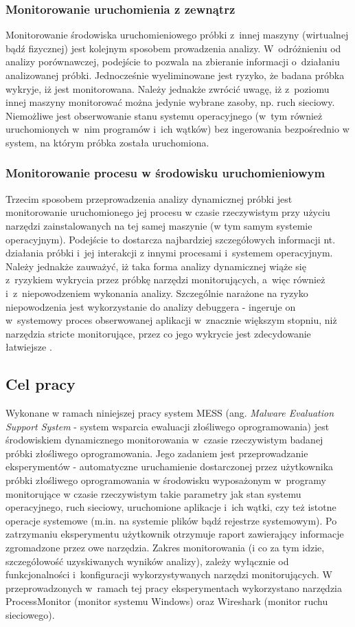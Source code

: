 \documentclass[a4paper,12pt,oneside]{article}
\begin{document}
	\subsubsection{Monitorowanie uruchomienia z zewnątrz}	
	Monitorowanie środowiska uruchomieniowego próbki z~innej maszyny (wirtualnej bądź fizycznej) jest kolejnym sposobem prowadzenia analizy. W~odróżnieniu od analizy porównawczej, podejście to pozwala na zbieranie informacji o~działaniu analizowanej próbki. Jednocześnie wyeliminowane jest ryzyko, że badana próbka wykryje, iż jest monitorowana. Należy jednakże zwrócić uwagę, iż z~poziomu innej maszyny monitorować można jedynie wybrane zasoby, np. ruch sieciowy. Niemożliwe jest obserwowanie stanu systemu operacyjnego (w~tym również uruchomionych w~nim programów i~ich wątków) bez ingerowania bezpośrednio w system, na którym próbka została uruchomiona.
	
	\subsubsection{Monitorowanie procesu w środowisku uruchomieniowym}	
	Trzecim sposobem przeprowadzenia analizy dynamicznej próbki jest monitorowanie uruchomionego jej procesu w czasie rzeczywistym przy użyciu narzędzi zainstalowanych na tej samej maszynie (w tym samym systemie operacyjnym). Podejście to dostarcza najbardziej szczegółowych informacji nt. działania próbki i~jej interakcji z innymi procesami i~systemem operacyjnym. Należy jednakże zauważyć, iż taka forma analizy dynamicznej wiąże się z~ryzykiem wykrycia przez próbkę narzędzi monitorujących, a~więc również i~z~niepowodzeniem wykonania analizy. Szczególnie narażone na ryzyko niepowodzenia jest wykorzystanie do analizy debuggera - ingeruje on w~systemowy proces obserwowanej aplikacji w~znacznie większym stopniu, niż narzędzia stricte monitorujące, przez co jego wykrycie jest zdecydowanie łatwiejsze \cite{book-malware,for-ultimate-antidbg,for-antivm-antidbg}.
			
	\subsection{Cel pracy}	
	Wykonane w ramach niniejszej pracy system MESS (ang. \textit{Malware Evaluation Support System} - system wsparcia ewaluacji złośliwego oprogramowania) jest środowiskiem dynamicznego monitorowania w~czasie rzeczywistym badanej próbki złośliwego oprogramowania. Jego zadaniem jest przeprowadzanie eksperymentów - automatyczne uruchamienie dostarczonej przez użytkownika próbki złośliwego oprogramowania w środowisku wyposażonym w~programy monitorujące w czasie rzeczywistym takie parametry jak stan systemu operacyjnego, ruch sieciowy, uruchomione aplikacje i~ich wątki, czy też istotne operacje systemowe (m.in. na systemie plików bądź rejestrze systemowym). Po zatrzymaniu eksperymentu użytkownik otrzymuje raport zawierający informacje zgromadzone przez owe narzędzia. Zakres monitorowania (i co za tym idzie, szczegółowość uzyskiwanych wyników analizy), zależy wyłącznie od funkcjonalności i~konfiguracji wykorzystywanych narzędzi monitorujących. W przeprowadzonych w~ramach tej pracy eksperymentach wykorzystano narzędzia ProcessMonitor (monitor systemu Windows) oraz Wireshark (monitor ruchu sieciowego).
	
\end{document}
